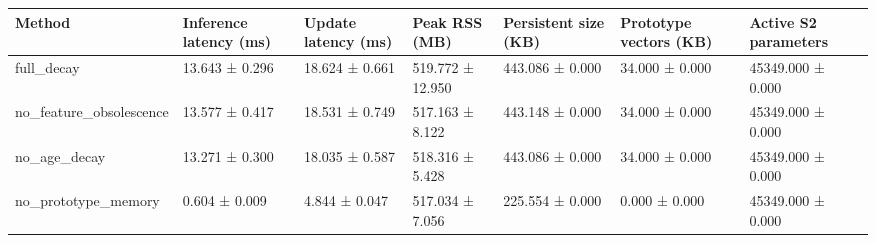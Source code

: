 \begin{tabular}{lllllll}
\toprule
Method & Inference latency (ms) & Update latency (ms) & Peak RSS (MB) & Persistent size (KB) & Prototype vectors (KB) & Active S2 parameters \\
\midrule
full\_decay & 13.643 ± 0.296 & 18.624 ± 0.661 & 519.772 ± 12.950 & 443.086 ± 0.000 & 34.000 ± 0.000 & 45349.000 ± 0.000 \\
no\_feature\_obsolescence & 13.577 ± 0.417 & 18.531 ± 0.749 & 517.163 ± 8.122 & 443.148 ± 0.000 & 34.000 ± 0.000 & 45349.000 ± 0.000 \\
no\_age\_decay & 13.271 ± 0.300 & 18.035 ± 0.587 & 518.316 ± 5.428 & 443.086 ± 0.000 & 34.000 ± 0.000 & 45349.000 ± 0.000 \\
no\_prototype\_memory & 0.604 ± 0.009 & 4.844 ± 0.047 & 517.034 ± 7.056 & 225.554 ± 0.000 & 0.000 ± 0.000 & 45349.000 ± 0.000 \\
\bottomrule
\end{tabular}
